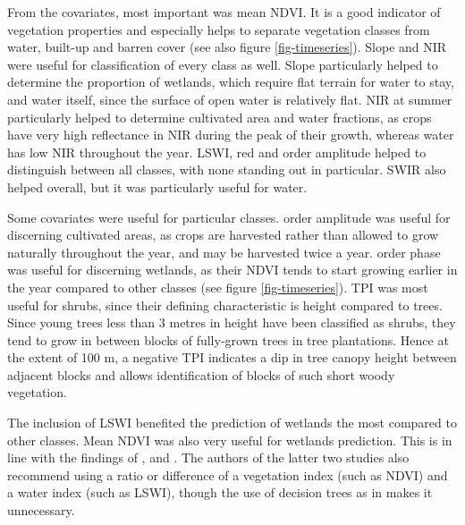 \documentclass[a4paper,12pt]{scrbook}
\begin{document}
From the covariates, most important was mean NDVI. It is a good indicator of vegetation properties and especially helps to separate vegetation classes from water, built-up and barren cover (see also figure \ref{fig-timeseries}). Slope and NIR were useful for classification of every class as well. Slope particularly helped to determine the proportion of wetlands, which require flat terrain for water to stay, and water itself, since the surface of open water is relatively flat. NIR at summer particularly helped to determine cultivated area and water fractions, as crops have very high reflectance in NIR during the peak of their growth, whereas water has low NIR throughout the year. LSWI, red and  order amplitude helped to distinguish between all classes, with none standing out in particular. SWIR also helped overall, but it was particularly useful for water.

Some covariates were useful for particular classes.  order amplitude was useful for discerning cultivated areas, as crops are harvested rather than allowed to grow naturally throughout the year, and may be harvested twice a year.  order phase was useful for discerning wetlands, as their NDVI tends to start growing earlier in the year compared to other classes (see figure \ref{fig-timeseries}). TPI was most useful for shrubs, since their defining characteristic is height compared to trees. Since young trees less than 3 metres in height have been classified as shrubs, they tend to grow in between blocks of fully-grown trees in tree plantations. Hence at the extent of 100 m, a negative TPI indicates a dip in tree canopy height between adjacent blocks and allows identification of blocks of such short woody vegetation.

The inclusion of LSWI benefited the prediction of wetlands the most compared to other classes. Mean NDVI was also very useful for wetlands prediction. This is in line with the findings of \citet{davranche2010wetland}, \citet{dong2014lswi} and \citet{zhao2009indices}. The authors of the latter two studies also recommend using a ratio or difference of a vegetation index (such as NDVI) and a water index (such as LSWI), though the use of decision trees as in \citet{davranche2010wetland} makes it unnecessary.
\end{document}
